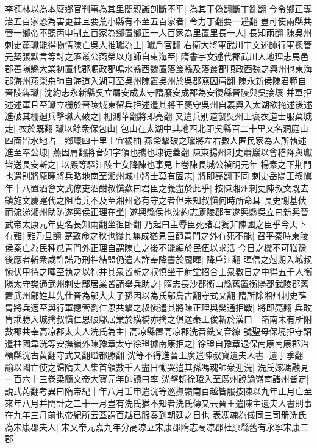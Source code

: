 李德林以為本廢鄉官判事為其里閭親識剖斷不平|{
	為其于偽翻斷丁亂翻}
今令鄉正專治五百家恐為害更甚且要荒小縣有不至五百家者|{
	令力丁翻要一遥翻}
豈可使兩縣共管一鄉帝不聽丙申制五百家為鄉置鄉正一人百家為里置里長一人|{
	長知兩翻}
陳吳州刺史蕭瓛能得物情陳亡吳人推瓛為主|{
	瓛戶官翻}
右衛大將軍武川宇文述帥行軍摠管元契張默言等討之落叢公燕榮以舟師自東海至|{
	隋書宇文述代郡武川人地理志馬邑郡善陽縣大業初置代郡順政郡鳴水縣西魏置落叢縣及落叢郡順政西魏之興州也東海郡海州燕榮舟師自海道入湖可至吳州陳置吳州於吳郡燕因肩翻}
陳永新侯陳君範自晉陵犇瓛|{
	沈約志永新縣吳立屬安成太守隋廢安成郡為安復縣晉陵與吳接壤}
并軍拒述述軍且至瓛立栅於晉陵城東留兵拒述遣其將王褒守吳州自義興入太湖欲掩述後述進破其栅迴兵擊瓛大破之|{
	栅測革翻將即亮翻}
又遣兵别道襲吳州王褒衣道士服棄城走|{
	衣於既翻}
瓛以餘衆保包山|{
	包山在太湖中其地西北距吳縣百二十里又名洞庭山四面皆水地占三鄉環四十里土宜橘柚}
燕榮擊破之瓛將左右數人匿民家為人所執述進至奉公埭|{
	燕因肩翻將音如字領也攜也埭徒蓋翻}
陳東揚州刺史蕭巖以會稽降與瓛皆送長安斬之|{
	以巖等驅江陵士女降陳也事見上卷陳長城公禎明元年}
楊素之下荆門也遣别將龎暉將兵略地南至湘州城中將士莫有固志|{
	將即亮翻下同}
刺史岳陽王叔愼年十八置酒會文武僚吏酒酣叔愼歎曰君臣之義盡於此乎|{
	按陳湘州刺史陳叔文既去鎮施文慶寔代之阻隋兵不及至湘州必有守之者但未知叔愼何時所命耳}
長史謝基伏而流涕湘州助防遂興侯正理在坐|{
	遂興縣侯也沈約志廬陵郡有遂興縣吳立曰新興晉武帝太康元年更名長知兩翻坐徂卧翻}
乃起曰主辱臣死諸君獨非陳國之臣乎今天下有難|{
	難乃旦翻}
寔致命之秋也縱其無成猶見臣節青門之外有死不能|{
	召平秦時東陵侯秦亡為民種瓜青門外正理自謂陳亡之後不能編於民伍以求活}
今日之機不可猶豫後應者斬衆咸許諾乃刑牲結盟仍遣人詐奉降書於龎暉|{
	降戶江翻}
暉信之尅期入城叔愼伏甲待之暉至執之以狥并其衆皆斬之叔慎坐于射堂招合士衆數日之中得五千人衡陽太守樊通武州刺史鄔居業皆請舉兵助之|{
	隋志長沙郡衡山縣舊置衡陽郡武陵郡舊置武州鄔姓其先仕晉為鄔大夫子孫因以為氏鄔烏古翻守式又翻}
隋所除湘州刺史薛胄將兵適至與行軍摠管劉仁恩共擊之叔愼遣其將陳正理與樊通拒戰|{
	將即亮翻}
兵敗胄乘勝入城擒叔愼仁恩破鄔居業於横橋亦擒之俱送秦王俊斬於漢口　嶺南未有所附數郡共奉高凉郡太夫人洗氏為主|{
	高凉縣置高凉郡洗音銑又音線}
號聖母保境拒守詔遣柱國韋洸等安撫嶺外陳豫章太守徐璒據南康拒之|{
	徐璒自豫章退保南康南康郡治贑縣洸古黄翻守式又翻璒都滕翻}
洸等不得進晉王廣遣陳叔寶遺夫人書|{
	遺于季翻}
諭以國亡使之歸隋夫人集首領數千人盡日慟哭遣其孫馮魂帥衆迎洸|{
	洗氏嫁馮融見一百六十三卷梁簡文帝大寶元年帥讀曰率}
洸擊斬徐璒入至廣州說諭嶺南諸州皆定|{
	說式芮翻考異曰隋帝紀十年八月壬申遣洸等巡撫嶺南百越皆服按陳以九年正月亡至來年八月并閏計之二十一月豈有洗氏猶不知者洗氏傳又云晉王遣陳主遺夫人書則事在九年三月前也帝紀所云蓋謂百越已服奏到朝廷之日也}
表馮魂為儀同三司册洗氏為宋康郡夫人|{
	宋文帝元嘉九年分高凉立宋康郡隋志高凉郡杜原縣舊有永寧宋康二郡}
